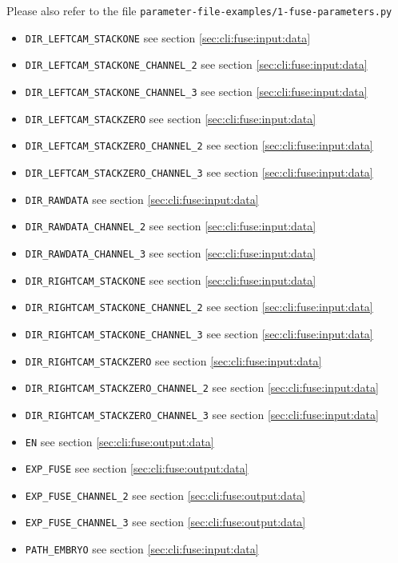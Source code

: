 Please also refer to the file
\texttt{parameter-file-examples/1-fuse-parameters.py}

\begin{itemize}
\itemsep -1ex
\item \texttt{DIR\_LEFTCAM\_STACKONE} see section \ref{sec:cli:fuse:input:data}
\item \texttt{DIR\_LEFTCAM\_STACKONE\_CHANNEL\_2} see section \ref{sec:cli:fuse:input:data}
\item \texttt{DIR\_LEFTCAM\_STACKONE\_CHANNEL\_3} see section \ref{sec:cli:fuse:input:data}
\item \texttt{DIR\_LEFTCAM\_STACKZERO} see section \ref{sec:cli:fuse:input:data}
\item \texttt{DIR\_LEFTCAM\_STACKZERO\_CHANNEL\_2} see section \ref{sec:cli:fuse:input:data}
\item \texttt{DIR\_LEFTCAM\_STACKZERO\_CHANNEL\_3} see section \ref{sec:cli:fuse:input:data}
\item \texttt{DIR\_RAWDATA} see section \ref{sec:cli:fuse:input:data}
\item \texttt{DIR\_RAWDATA\_CHANNEL\_2} see section \ref{sec:cli:fuse:input:data}
\item \texttt{DIR\_RAWDATA\_CHANNEL\_3} see section \ref{sec:cli:fuse:input:data}
\item \texttt{DIR\_RIGHTCAM\_STACKONE} see section \ref{sec:cli:fuse:input:data}
\item \texttt{DIR\_RIGHTCAM\_STACKONE\_CHANNEL\_2} see section \ref{sec:cli:fuse:input:data}
\item \texttt{DIR\_RIGHTCAM\_STACKONE\_CHANNEL\_3} see section \ref{sec:cli:fuse:input:data}
\item \texttt{DIR\_RIGHTCAM\_STACKZERO} see section \ref{sec:cli:fuse:input:data}
\item \texttt{DIR\_RIGHTCAM\_STACKZERO\_CHANNEL\_2} see section \ref{sec:cli:fuse:input:data}
\item \texttt{DIR\_RIGHTCAM\_STACKZERO\_CHANNEL\_3} see section \ref{sec:cli:fuse:input:data}
\item \texttt{EN} see section \ref{sec:cli:fuse:output:data}
\item \texttt{EXP\_FUSE} see section \ref{sec:cli:fuse:output:data}
\item \texttt{EXP\_FUSE\_CHANNEL\_2} see section \ref{sec:cli:fuse:output:data}
\item \texttt{EXP\_FUSE\_CHANNEL\_3} see section \ref{sec:cli:fuse:output:data}
\item \texttt{PATH\_EMBRYO} see section \ref{sec:cli:fuse:input:data}

\end{itemize}
